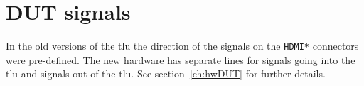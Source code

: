 \chapter{DUT signals}\label{ch:DUTsignals}
In the old versions of the \gls{tlu} the direction of the signals on the \verb|HDMI*| connectors were pre-defined. The new hardware has separate lines for signals going into the \gls{tlu} and signals out of the \gls{tlu}. See section~\ref{ch:hwDUT} for further details.\\ 